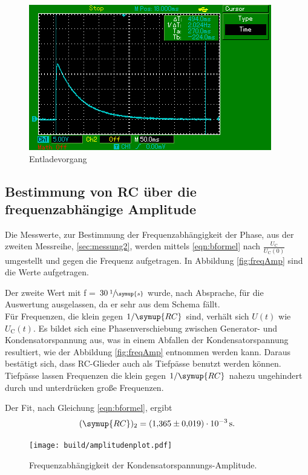 \begin{figure}
  \centering
  \includegraphics{content/Bilder/entladevorgang.jpg}
  \caption{Entladevorgang}
  \label{fig:entladung}
\end{figure}

\newpage

\subsection{Bestimmung von RC über die frequenzabhängige Amplitude}
\label{sec:auswertung2}
Die Messwerte, zur Bestimmung der Frequenzabhängigkeit der Phase, aus der
zweiten Messreihe, \eqref{sec:messung2}, werden mittels
\eqref{eqn:bformel} nach $\frac{U_\text{C}}{U_\text{C}(0)}$ umgestellt und gegen die Frequenz
aufgetragen. In Abbildung \eqref{fig:freqAmp} sind die Werte aufgetragen.

Der zweite Wert mit f = $30 \:\sfrac{1}{\symup{s}}$ wurde, nach Absprache,
für die Auswertung ausgelassen, da er sehr aus dem Schema fällt.
\\
Für Frequenzen, die klein gegen $1 / \symup{RC}$ sind, verhält sich $U(t)$ wie
$U_\text{C}(t)$. Es bildet sich eine
Phasenverschiebung zwischen Generator- und Kondensatorspannung aus, was in
einem Abfallen der Kondensatorspannung resultiert, wie der Abbildung
\eqref{fig:freqAmp} entnommen werden kann.
Daraus bestätigt sich, dass RC-Glieder auch als Tiefpässe benutzt werden können.
Tiefpässe lassen Frequenzen die klein gegen $1 / \symup{RC}$ nahezu ungehindert
durch und unterdrücken große Frequenzen.

Der Fit, nach Gleichung \ref{eqn:bformel}, ergibt
\begin{equation*}
  (\symup{RC})_2 = \SI{1.365(0019)e-3}{\second}.
\end{equation*}

\begin{figure}
  \texttt{[image: build/amplitudenplot.pdf]}
  \caption{Frequenzabhängigkeit der Kondensatorspannungs-Amplitude.}
  \label{fig:freqAmp}
\end{figure}

